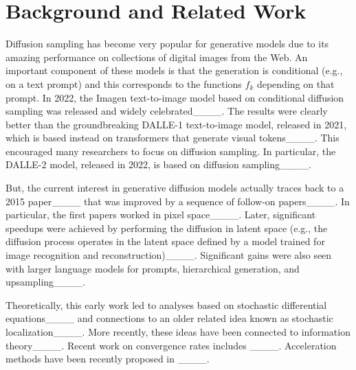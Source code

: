 \section{Background and Related Work}
Diffusion sampling has become very popular for generative models due to its amazing performance on collections of digital images from the Web.
An important component of these models is that the generation is conditional (e.g., on a text prompt) and this corresponds to the functions $f_k$ depending on that prompt.
In 2022, the Imagen text-to-image model based on conditional diffusion sampling was released and widely celebrated____.
The results were clearly better than the groundbreaking DALLE-1 text-to-image model, released in 2021, which is based instead on transformers that generate visual tokens____.
This encouraged many researchers to focus on diffusion sampling.
In particular, the DALLE-2 model, released in 2022, is based on diffusion sampling____.

But, the current interest in generative diffusion models actually traces back to a 2015 paper____ that was improved by a sequence of follow-on papers____. In particular, the first papers worked in pixel space____. Later, significant speedups were achieved by performing the diffusion in latent space (e.g., the diffusion process operates in the latent space defined by a model trained for image recognition and reconstruction)____. Significant gains were also seen with larger language models for prompts, hierarchical generation, and upsampling____.

Theoretically, this early work led to analyses based on stochastic differential equations____ and connections to an older related idea known as stochastic localization____.
More recently, these ideas have been connected to information theory____. Recent work on convergence rates includes ____. 
Acceleration methods have been recently proposed in  ____.